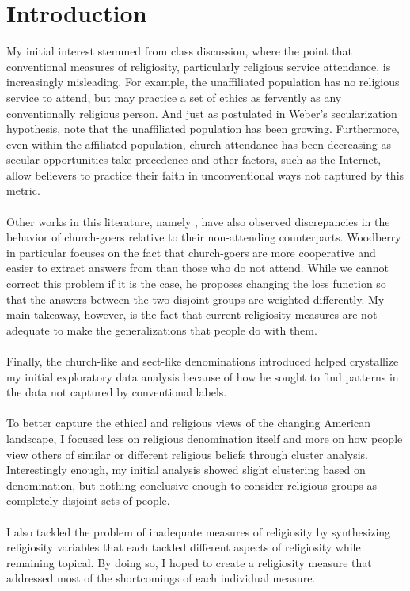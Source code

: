 \documentclass{article}
\begin{document}
	\section{Introduction}
	My initial interest stemmed from class discussion, where the point that conventional measures of religiosity, particularly religious service attendance, is increasingly misleading. For example, the unaffiliated population has no religious service to attend, but may practice a set of ethics as fervently as any conventionally religious person. And just as postulated in Weber's secularization hypothesis, \cite{inc_secularization} note that the unaffiliated population has been growing. Furthermore, even within the affiliated population, church attendance has been decreasing as secular opportunities take precedence and other factors, such as the Internet, allow believers to practice their faith in unconventional ways not captured by this metric. 
	\\
	\\
	Other works in this literature, namely \cite{oversample_survey}, have also observed discrepancies in the behavior of church-goers relative to their non-attending counterparts. Woodberry in particular focuses on the fact that church-goers are more cooperative and easier to extract answers from than those who do not attend. While we cannot correct this problem if it is the case, he proposes changing the loss function so that the answers between the two disjoint groups are weighted differently. My main takeaway, however, is the fact that current religiosity measures are not adequate to make the generalizations that people do with them.
	\\
	\\
	Finally, the church-like and sect-like denominations \cite{sects} introduced helped crystallize my initial exploratory data analysis because of how he sought to find patterns in the data not captured by conventional labels.
	\\
	\\
	To better capture the ethical and religious views of the changing American landscape, I focused less on religious denomination itself and more on how
	people view others of similar or different religious beliefs through cluster analysis. Interestingly enough, my initial analysis showed slight clustering based on denomination, but nothing conclusive enough to consider religious groups as completely disjoint sets of people.
	\\
	\\
	I also tackled the problem of inadequate measures of religiosity by synthesizing religiosity variables that each tackled different aspects of religiosity while remaining topical. By doing so, I hoped to create a religiosity measure that addressed most of the shortcomings of each individual measure.
	
\end{document}
